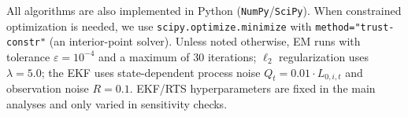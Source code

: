 All algorithms are also implemented in Python (\texttt{NumPy}/\texttt{SciPy}). When constrained optimization is needed, we use \texttt{scipy.optimize.minimize} with \texttt{method="trust-constr"} (an interior-point solver). Unless noted otherwise, EM runs with tolerance $\varepsilon = 10^{-4}$ and a maximum of 30 iterations; $\ell_2$ regularization uses $\lambda = 5.0$; the EKF uses state-dependent process noise $Q_t = 0.01 \cdot L_{0,i,t}$ and observation noise $R = 0.1$. EKF/RTS hyperparameters are fixed in the main analyses and only varied in sensitivity checks.

